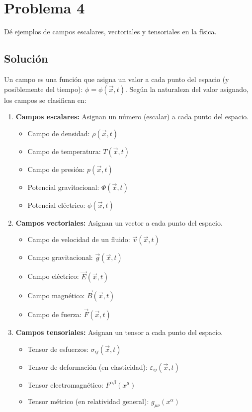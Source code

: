 \documentclass[a4paper]{article}
\begin{document}
\section{Problema 4}
Dé ejemplos de campos escalares, vectoriales y tensoriales en la física.

\subsection{Solución}

Un campo es una función que asigna un valor a cada punto del espacio (y posiblemente del tiempo): $\phi = \phi(\vec{x}, t)$. Según la naturaleza del valor asignado, los campos se clasifican en:

\begin{enumerate}
    \item \textbf{Campos escalares:} Asignan un número (escalar) a cada punto del espacio.
    \begin{itemize}
        \item Campo de densidad: $\rho(\vec{x}, t)$
        \item Campo de temperatura: $T(\vec{x}, t)$
        \item Campo de presión: $p(\vec{x}, t)$
        \item Potencial gravitacional: $\Phi(\vec{x}, t)$
        \item Potencial eléctrico: $\phi(\vec{x}, t)$
    \end{itemize}

    \item \textbf{Campos vectoriales:} Asignan un vector a cada punto del espacio.
    \begin{itemize}
        \item Campo de velocidad de un fluido: $\vec{v}(\vec{x}, t)$
        \item Campo gravitacional: $\vec{g}(\vec{x}, t)$
        \item Campo eléctrico: $\vec{E}(\vec{x}, t)$
        \item Campo magnético: $\vec{B}(\vec{x}, t)$
        \item Campo de fuerza: $\vec{F}(\vec{x}, t)$
    \end{itemize}

    \item \textbf{Campos tensoriales:} Asignan un tensor a cada punto del espacio.
    \begin{itemize}
        \item Tensor de esfuerzos: $\sigma_{ij}(\vec{x}, t)$
        \item Tensor de deformación (en elasticidad): $\varepsilon_{ij}(\vec{x}, t)$
        \item Tensor electromagnético: $F^{\alpha\beta}(x^\mu)$
        \item Tensor métrico (en relatividad general): $g_{\mu\nu}(x^\alpha)$
    \end{itemize}
\end{enumerate}
\end{document}
